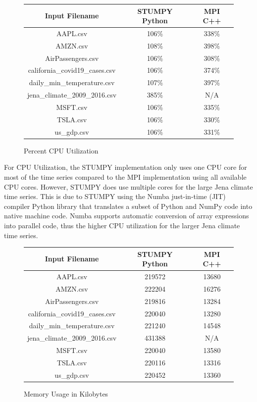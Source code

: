 \documentclass[conference]{IEEEtran}
\begin{document}
\begin{figure}
\begin{center}
\caption{Percent CPU Utilization}
\begin{tabular}{|c|c|c|}
\hline
\textbf{Input Filename} & \textbf{STUMPY Python} & \textbf{MPI C++} \\ \hline \hline
AAPL.csv & 106\% & 338\% \\ \hline
AMZN.csv & 108\% & 398\% \\ \hline
AirPassengers.csv & 106\% & 308\% \\ \hline
california\_covid19\_cases.csv & 106\% & 374\% \\ \hline
daily\_min\_temperature.csv & 107\% & 397\% \\ \hline
jena\_climate\_2009\_2016.csv & 385\% & N/A \\ \hline
MSFT.csv & 106\% & 335\% \\ \hline
TSLA.csv & 106\% & 330\% \\ \hline
us\_gdp.csv & 106\% & 331\% \\ \hline \hline
\end{tabular}
\label{fig:CPU_Utilization}
\end{center}
\end{figure}

For CPU Utilization, the STUMPY implementation only uses one CPU core for most of the time series compared to the MPI implementation using all available CPU cores.  However, STUMPY does use multiple cores for the large Jena climate time series.  This is due to STUMPY using the Numba just-in-time (JIT) compiler Python library that translates a subset of Python and NumPy code into native machine code.  Numba supports automatic conversion of array expressions into parallel code\cite{Numba}, thus the higher CPU utilization for the larger Jena climate time series.  

\begin{figure}
\begin{center}
\caption{Memory Usage in Kilobytes}
\begin{tabular}{|c|c|c|}
\hline
\textbf{Input Filename} & \textbf{STUMPY Python} & \textbf{MPI C++} \\ \hline \hline
AAPL.csv & 219572 & 13680 \\ \hline
AMZN.csv & 222204 & 16276 \\ \hline
AirPassengers.csv & 219816 & 13284 \\ \hline
california\_covid19\_cases.csv & 220040 & 13280 \\ \hline
daily\_min\_temperature.csv & 221240 & 14548 \\ \hline
jena\_climate\_2009\_2016.csv & 431388 & N/A \\ \hline
MSFT.csv & 220040 & 13580 \\ \hline
TSLA.csv & 220116 & 13316 \\ \hline
us\_gdp.csv & 220452 & 13360 \\ \hline \hline
\end{tabular}
\label{fig:Memory_Usage}
\end{center}
\end{figure}
\end{document}
